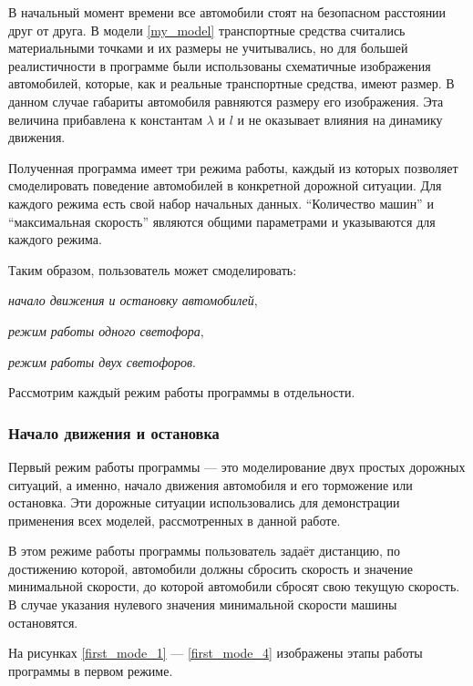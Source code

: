 \documentclass[12pt, a4paper]{extarticle}
\renewenvironment{itemize}[1][{---\hfil}]{\begin{list}{#1}{\topsep=0pt\parsep=0pt plus 1pt\itemsep=\parsep\leftmargin=0pt \itemindent=\parindent}\addtolength{\itemindent}{\labelwidth}}{\end{list}}
\numberwithin{equation}{section}
\numberwithin{figure}{section}
\begin{document}
В начальный момент времени все автомобили стоят на безопасном расстоянии друг от друга. В модели \eqref{my_model} транспортные средства считались материальными точками и их размеры не учитывались, но для большей реалистичности в программе были использованы схематичные изображения автомобилей, которые, как и реальные транспортные средства, имеют размер. В данном случае габариты автомобиля равняются размеру его изображения. Эта величина прибавлена к константам $\lambda$ и $l$ и не оказывает влияния на динамику движения.

Полученная программа имеет три режима работы, каждый из которых позволяет смоделировать поведение автомобилей в конкретной дорожной ситуации. Для каждого режима есть свой набор начальных данных. ``Количество машин'' и ``максимальная скорость'' являются общими параметрами и указываются для каждого режима.

\noindent Таким образом, пользователь может смоделировать:

\begin{itemize} 
	\item \textit{начало движения и остановку автомобилей},
	\item \textit{режим работы одного светофора},
	\item \textit{режим работы двух светофоров}.
\end{itemize}

\noindent Рассмотрим каждый режим работы программы в отдельности.

\subsubsection{Начало движения и остановка}

Первый режим работы программы --- это моделирование двух простых дорожных ситуаций, а именно, начало движения автомобиля и его торможение или остановка. Эти дорожные ситуации использовались для демонстрации применения всех моделей, рассмотренных в данной работе.

В этом режиме работы программы пользователь задаёт дистанцию, по достижению которой, автомобили должны сбросить скорость и значение минимальной скорости, до которой автомобили сбросят свою текущую скорость. В случае указания нулевого значения минимальной скорости машины остановятся.

На рисунках \ref{first_mode_1} --- \ref{first_mode_4} изображены этапы работы программы в первом режиме.
\end{document}
